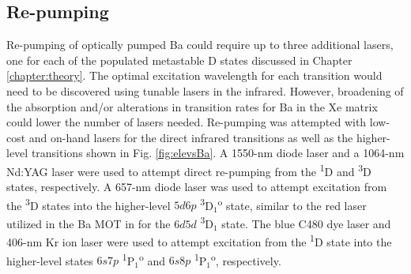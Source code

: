 
\subsection{Re-pumping}


Re-pumping of optically pumped Ba could require up to three additional lasers, one for each of the populated metastable D states discussed in Chapter \ref{chapter:theory}.  The optimal excitation wavelength for each transition would need to be discovered using tunable lasers in the infrared.  However, broadening of the absorption and/or alterations in transition rates for Ba in the Xe matrix could lower the number of lasers needed.  Re-pumping was attempted with low-cost and on-hand lasers for the direct infrared transitions as well as the higher-level transitions shown in Fig. \ref{fig:elevsBa}.  A 1550-nm diode laser and a 1064-nm Nd:YAG laser were used to attempt direct re-pumping from the \textsuperscript{1}D and \textsuperscript{3}D states, respectively.  A 657-nm diode laser was used to attempt excitation from the \textsuperscript{3}D states into the higher-level $5d6p$ \textsuperscript{3}D$_{1}$\textsuperscript{o} state, similar to the red laser utilized in the Ba MOT in \cite{BaMOT} for the $6d5d$ \textsuperscript{3}D$_{1}$ state.  The blue C480 dye laser and 406-nm Kr ion laser were used to attempt excitation from the \textsuperscript{1}D state into the higher-level states $6s7p$ \textsuperscript{1}P$_{1}$\textsuperscript{o} and $6s8p$ \textsuperscript{1}P$_{1}$\textsuperscript{o}, respectively.


